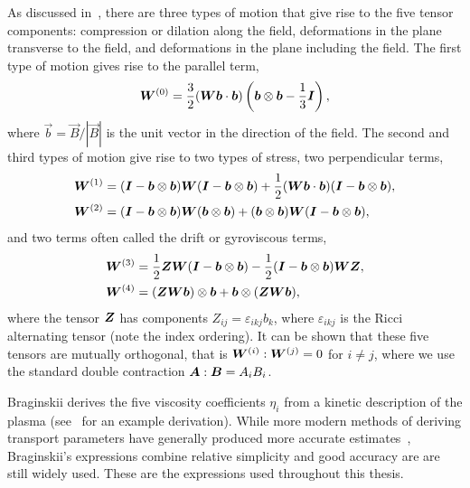 As discussed in~\cite{kaufmanPlasmaViscosityMagnetic1960}, there are three types of motion that give rise to the five tensor components: compression or dilation along the field, deformations in the plane transverse to the field, and deformations in the plane including the field. The first type of motion gives rise to the parallel term,
\begin{equation}
  \label{eq:braginskii_parallel_term}
  {\bm W}^{(0)} = \frac{3}{2}({\bm W}{\bm b}\cdot{\bm b}) \left( {\bm b} \otimes {\bm b} - \frac{1}{3}{\bm I} \right),
\end{equation}
where $\vec{b} = \vec{B}/|\vec{B}|$ is the unit vector in the direction of the field. The second and third types of motion give rise to two types of stress, two perpendicular terms,
\begin{align}
{\bm W}^{(1)} &= ({\bm I} - {\bm b} \otimes {\bm b}){\bm W}({\bm I} - {\bm b} \otimes {\bm b}) + \frac{1}{2}({\bm W}{\bm b} \cdot {\bm b})({\bm I} - {\bm b} \otimes {\bm b}), \\
{\bm W}^{(2)} &= ({\bm I} - {\bm b} \otimes {\bm b}){\bm W}({\bm b} \otimes {\bm b}) + ({\bm b} \otimes {\bm b}){\bm W}({\bm I} - {\bm b} \otimes {\bm b}),  \\
\end{align}
and two terms often called the drift or gyroviscous terms,
\begin{align}
{\bm W}^{(3)} &= \frac{1}{2} {\bm Z}{\bm W}({\bm I} - {\bm b} \otimes {\bm b}) - \frac{1}{2}({\bm I} - {\bm b} \otimes {\bm b}){\bm W}{\bm Z}, \\
{\bm W}^{(4)} &= ({\bm Z}{\bm W}{\bm b}) \otimes {\bm b} + {\bm b} \otimes ({\bm Z} {\bm W} {\bm b}), \\
\label{eq:drift_terms}
\end{align}
where the tensor ${\bm Z}$ has components $Z_{ij} = \varepsilon_{ikj}b_k$, where $\varepsilon_{ikj}$ is the Ricci alternating tensor (note the index ordering). It can be shown that these five tensors are mutually orthogonal, that is ${\bm W}^{(i)}:{\bm W}^{(j)} = 0$ for $i\ne j$, where we use the standard double contraction ${\bm A}:{\bm B} = A_iB_i$.

Braginskii derives the five viscosity coefficients $\eta_i$ from a kinetic description of the plasma (see~\cite{epperleinPlasmaTransportCoefficients1986} for an example derivation). While more modern methods of deriving transport parameters have generally produced more accurate estimates~\cite{epperleinPlasmaTransportCoefficients1986}, Braginskii's expressions combine relative simplicity and good accuracy are are still widely used. These are the expressions used throughout this thesis.

